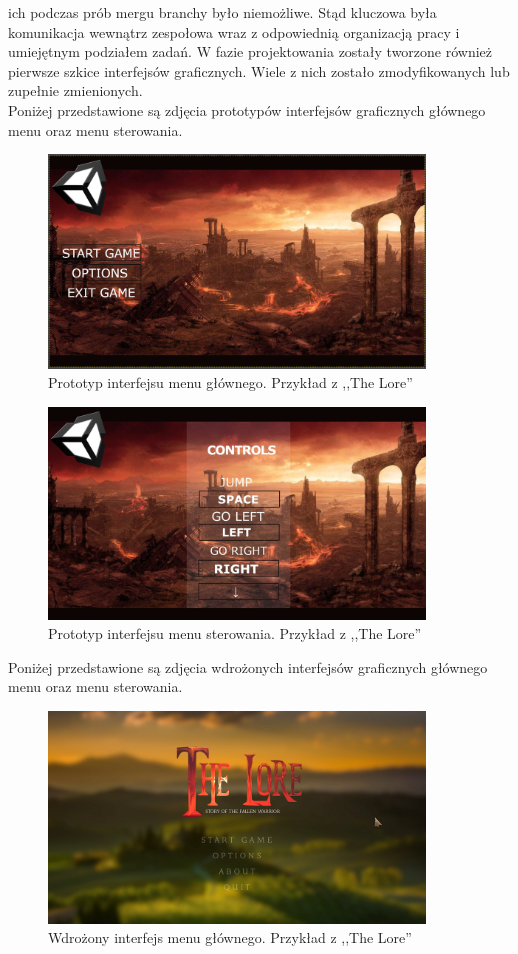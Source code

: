 \documentclass[oneside,polski,logo]{amuthesis}
\begin{document}
ich podczas prób mergu branchy było niemożliwe. Stąd kluczowa była komunikacja wewnątrz zespołowa wraz z odpowiednią organizacją pracy i umiejętnym podziałem zadań. W fazie projektowania zostały tworzone również pierwsze szkice interfejsów graficznych. Wiele z nich zostało zmodyfikowanych lub zupełnie zmienionych.\\
Poniżej przedstawione są zdjęcia prototypów interfejsów graficznych głównego menu oraz menu sterowania.\\

\begin{figure}[h]
	\centering
	\includegraphics[width=10cm]{images/hyps/proto.png}
	\caption{Prototyp interfejsu menu głównego. Przykład z ,,The Lore''}
\end{figure}

\begin{figure}[h]
	\centering
	\includegraphics[width=10cm]{images/hyps/proto2.jpg}
	\caption{Prototyp interfejsu menu sterowania. Przykład z ,,The Lore''}
\end{figure}

Poniżej przedstawione są zdjęcia wdrożonych interfejsów graficznych głównego menu oraz menu sterowania.\\

\begin{figure}[h]
	\centering
	\includegraphics[width=10cm]{images/hyps/of1.png}
	\caption{Wdrożony interfejs menu głównego. Przykład z ,,The Lore''}
\end{figure}
\end{document}
